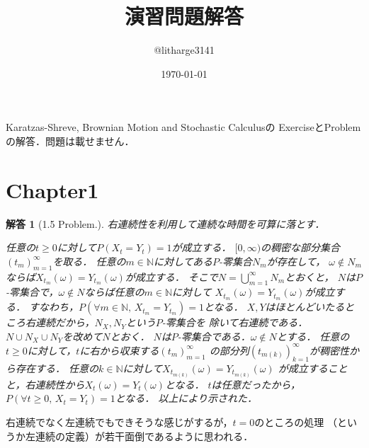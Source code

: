 \documentclass[dvipdfmx,autodetect-engine]{jsarticle}
\newtheorem*{ans}{解答}
\theoremstyle{remark}
\theoremstyle{definition}
\newcommand{\N}{\mathbb{N}}
\begin{document}
\title{演習問題解答}
\author{@litharge3141}
\date{\today}
\maketitle

\abstract
Karatzas-Shreve, Brownian Motion and Stochastic Calculusの
ExerciseとProblemの解答．問題は載せません．

\section{Chapter1}
\begin{ans}[1.5 Problem.]
    右連続性を利用して連続な時間を可算に落とす．

    任意の$t \geq 0$に対して$P(X_{t}=Y_{t})=1$が成立する．
    $[0,\infty)$の稠密な部分集合$(t_{m})_{m=1}^{\infty}$を取る．
    任意の$m \in \N$に対してある$P$-零集合$N_{m}$が存在して，
    $\omega \notin N_{m}$ならば$X_{t_{m}}(\omega) = Y_{t_{m}}(\omega)$が成立する．
    そこで$N = \bigcup_{m=1}^{\infty} N_{m}$とおくと，
    $N$は$P$-零集合で，$\omega \notin N$ならば任意の$m\in \N$に対して
    $X_{t_{m}}(\omega) = Y_{t_{m}}(\omega)$が成立する．
    すなわち，$P(\forall m\in \N,\, X_{t_{m}} = Y_{t_{m}})=1$となる．
    $X,Y$はほとんどいたるところ右連続だから，$N_{X},N_{Y}$という$P$-零集合を
    除いて右連続である．$N \cup N_{X} \cup N_{Y}$を改めて$N$とおく．
    $N$は$P$-零集合である．$\omega \notin N$とする．
    任意の$t \geq 0$に対して，$t$に右から収束する$(t_{m})_{m=1}^{\infty}$
    の部分列$(t_{m(k)})_{k=1}^{\infty}$が稠密性から存在する．
    任意の$k\in \N$に対して$X_{t_{m(k)}}(\omega) = Y_{t_{m(k)}}(\omega)$
    が成立することと，右連続性から$X_{t}(\omega) = Y_{t}(\omega)$となる．
    $t$は任意だったから，$P(\forall t\geq 0,\, X_{t}=Y_{t})=1$となる．
    以上により示された．
\end{ans}
右連続でなく左連続でもできそうな感じがするが，$t=0$のところの処理
（というか左連続の定義）が若干面倒であるように思われる．
\end{document}
